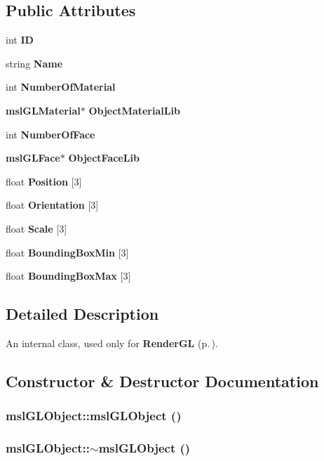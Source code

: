 \subsection*{Public Attributes}
\begin{CompactItemize}
\item 
int {\bf ID}
\item 
string {\bf Name}
\item 
int {\bf Number\-Of\-Material}
\item 
{\bf msl\-GLMaterial}$\ast$ {\bf Object\-Material\-Lib}
\item 
int {\bf Number\-Of\-Face}
\item 
{\bf msl\-GLFace}$\ast$ {\bf Object\-Face\-Lib}
\item 
float {\bf Position} [3]
\item 
float {\bf Orientation} [3]
\item 
float {\bf Scale} [3]
\item 
float {\bf Bounding\-Box\-Min} [3]
\item 
float {\bf Bounding\-Box\-Max} [3]
\end{CompactItemize}


\subsection{Detailed Description}
An internal class, used only for {\bf Render\-GL} {\rm (p.\,\pageref{class_RenderGL})}.



\subsection{Constructor \& Destructor Documentation}
\subsubsection{\setlength{\rightskip}{0pt plus 5cm}msl\-GLObject::msl\-GLObject ()}\label{class_mslGLObject_a0}


\subsubsection{\setlength{\rightskip}{0pt plus 5cm}msl\-GLObject::$\sim$msl\-GLObject ()}\label{class_mslGLObject_a1}




